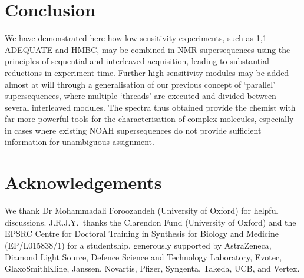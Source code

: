 \documentclass[a4paper,12pt]{article}
\newcommand{\nitrogen}{\ch{^{15}N}}
\begin{document}
\begin{refsection}
\section{Conclusion}

We have demonstrated here how low-sensitivity experiments, such as 1,1-ADEQUATE and \nitrogen{} HMBC, may be combined in NMR supersequences using the principles of sequential and interleaved acquisition, leading to substantial reductions in experiment time.
Further high-sensitivity modules may be added almost at will through a generalisation of our previous concept of `parallel' supersequences, where multiple `threads' are executed and divided between several interleaved modules.
The spectra thus obtained provide the chemist with far more powerful tools for the characterisation of complex molecules, especially in cases where existing NOAH supersequences do not provide sufficient information for unambiguous assignment.

\section*{Acknowledgements}

We thank Dr Mohammadali Foroozandeh (University of Oxford) for helpful discussions.
J.R.J.Y.\ thanks the Clarendon Fund (University of Oxford) and the EPSRC Centre for Doctoral Training in Synthesis for Biology and Medicine (EP/L015838/1) for a studentship, generously supported by AstraZeneca, Diamond Light Source, Defence Science and Technology Laboratory, Evotec, GlaxoSmithKline, Janssen, Novartis, Pfizer, Syngenta, Takeda, UCB, and Vertex.

\AtNextBibliography{\small}
\printbibliography{}
\end{refsection}


\end{document}
